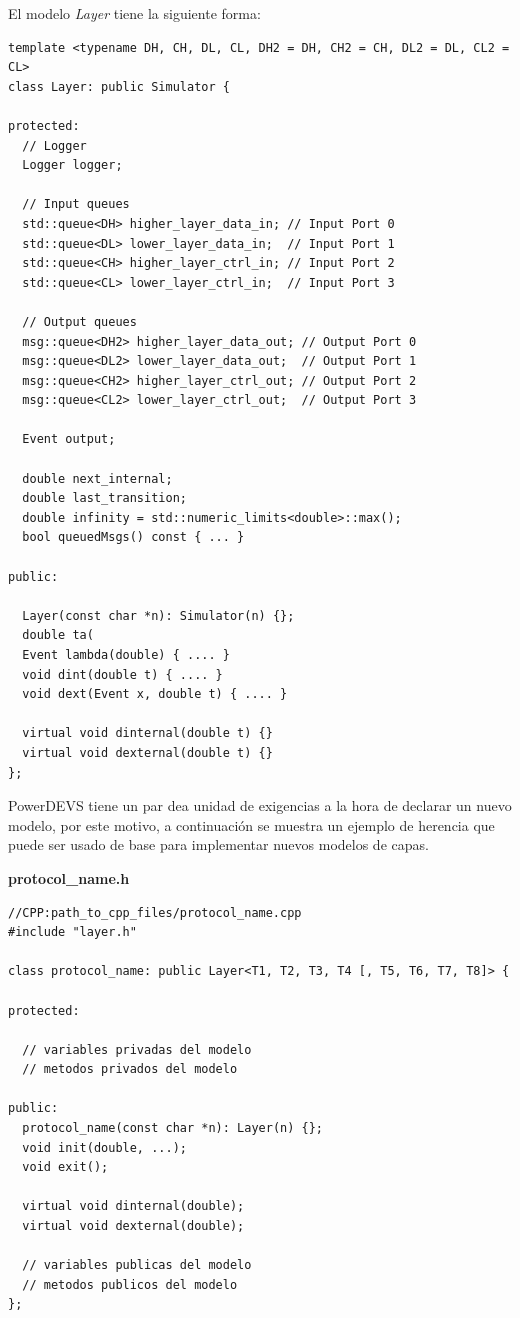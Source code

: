 \documentclass[10pt,a4paper]{article}
\begin{document}
El modelo \textit{Layer} tiene la siguiente forma:
\begin{lstlisting}
template <typename DH, CH, DL, CL, DH2 = DH, CH2 = CH, DL2 = DL, CL2 = CL>
class Layer: public Simulator { 

protected:
  // Logger
  Logger logger;

  // Input queues
  std::queue<DH> higher_layer_data_in; // Input Port 0
  std::queue<DL> lower_layer_data_in;  // Input Port 1
  std::queue<CH> higher_layer_ctrl_in; // Input Port 2 
  std::queue<CL> lower_layer_ctrl_in;  // Input Port 3
  
  // Output queues
  msg::queue<DH2> higher_layer_data_out; // Output Port 0 
  msg::queue<DL2> lower_layer_data_out;  // Output Port 1
  msg::queue<CH2> higher_layer_ctrl_out; // Output Port 2
  msg::queue<CL2> lower_layer_ctrl_out;  // Output Port 3

  Event output;

  double next_internal;
  double last_transition;
  double infinity = std::numeric_limits<double>::max();
  bool queuedMsgs() const { ... }

public:

  Layer(const char *n): Simulator(n) {};
  double ta(
  Event lambda(double) { .... }
  void dint(double t) { .... }
  void dext(Event x, double t) { .... }
  
  virtual void dinternal(double t) {}
  virtual void dexternal(double t) {}
};
\end{lstlisting}

PowerDEVS tiene un par dea unidad de exigencias a la hora de declarar un nuevo modelo, por este motivo, a continuación se muestra un ejemplo de herencia que puede ser usado de base para implementar nuevos modelos de capas. \\

\newpage

\textbf{protocol\_name.h}
\begin{lstlisting}
//CPP:path_to_cpp_files/protocol_name.cpp
#include "layer.h"

class protocol_name: public Layer<T1, T2, T3, T4 [, T5, T6, T7, T8]> { 

protected:
	
  // variables privadas del modelo
  // metodos privados del modelo

public:
  protocol_name(const char *n): Layer(n) {};
  void init(double, ...);
  void exit();

  virtual void dinternal(double);
  virtual void dexternal(double);
  
  // variables publicas del modelo
  // metodos publicos del modelo
};
\end{lstlisting}
\end{document}
